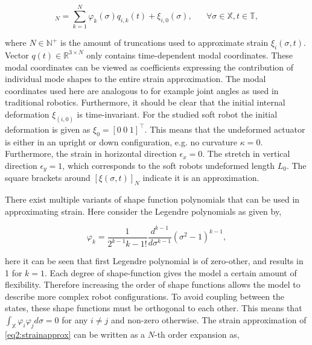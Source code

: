 \begin{equation}
    [\xi_i(\sigma,t)]_N = \sum_{k=1}^N \varphi_k(\sigma)q_{i,k}(t) + \xi_{i,0}(\sigma), \hspace{20pt} \forall \sigma \in \mathbb{X}, t \in \mathbb{T},
    \label{eq2:strainapprox}
\end{equation}

where $N \in \mathbb{N}^+$ is the amount of truncations used to approximate strain $\xi_i(\sigma,t)$. Vector $q(t) \in \mathbb{R}^{3 \times N}$ only contains time-dependent modal coordinates. These modal coordinates can be viewed as coefficients expressing the contribution of individual mode shapes to the entire strain approximation. The modal coordinates used here are analogous to for example joint angles as used in traditional robotics. Furthermore, it should be clear that the initial internal deformation $\xi_{(i,0)}$ is time-invariant. For the studied soft robot the initial deformation is given as $\xi_0 = [0 \hspace{3pt} 0 \hspace{3pt} 1]^\top$. This means that the undeformed actuator is either in an upright or down configuration, e.g. no curvature $\kappa = 0$. Furthermore, the strain in horizontal direction $\epsilon_x = 0$. The stretch in vertical direction $\epsilon_y = 1$, which corresponds to the soft robots undeformed length $L_0$. The square brackets around $[\xi(\sigma,t)]_N$ indicate it is an approximation. 

There exist multiple variants of shape function polynomials that can be used in approximating strain. Here consider the Legendre polynomials as given by,

\begin{equation}
    \varphi_{k} = \frac{1}{2^{k-1} k-1!} \frac{d^{k-1}}{d\sigma^{k-1}}(\sigma^2-1)^{k-1},
    \label{eq2:shapefunction}
\end{equation}

here it can be seen that first Legendre polynomial is of zero-other, and results in 1 for $k=1$. Each degree of shape-function gives the model a certain amount of flexibility. Therefore increasing the order of shape functions allows the model to describe more complex robot configurations. To avoid coupling between the states, these shape functions must be orthogonal to each other. This means that $\int_\mathbb{X} \varphi_i \varphi_j d \sigma = 0$ for any $i \neq j$ and non-zero otherwise. The strain approximation of \ref{eq2:strainapprox} can be written as a $N$-th order expansion as,



